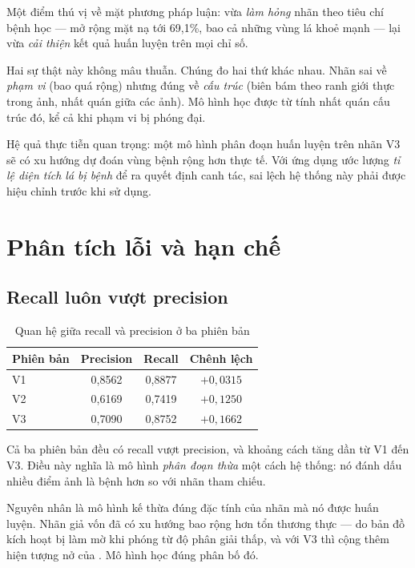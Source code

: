 Một điểm thú vị về mặt phương pháp luận: \SAM{} vừa \emph{làm hỏng} nhãn theo tiêu
chí bệnh học --- mở rộng mặt nạ tới 69,1\%, bao cả những vùng lá khoẻ mạnh ---
lại vừa \emph{cải thiện} kết quả huấn luyện trên mọi chỉ số.

Hai sự thật này không mâu thuẫn. Chúng đo hai thứ khác nhau. Nhãn \SAM{} sai về
\emph{phạm vi} (bao quá rộng) nhưng đúng về \emph{cấu trúc} (biên bám theo ranh
giới thực trong ảnh, nhất quán giữa các ảnh). Mô hình học được từ tính nhất quán
cấu trúc đó, kể cả khi phạm vi bị phóng đại.

Hệ quả thực tiễn quan trọng: một mô hình phân đoạn huấn luyện trên nhãn V3 sẽ có
xu hướng dự đoán vùng bệnh rộng hơn thực tế. Với ứng dụng ước lượng \emph{tỉ lệ
diện tích lá bị bệnh} để ra quyết định canh tác, sai lệch hệ thống này phải được
hiệu chỉnh trước khi sử dụng.

\section{Phân tích lỗi và hạn chế}
\label{sec:phantichloi}

\subsection{Recall luôn vượt precision}

\begin{table}[H]
\centering
\caption{Quan hệ giữa recall và precision ở ba phiên bản}
\label{tab:recall_precision}
\begin{tabular}{l c c c}
\toprule
\textbf{Phiên bản} & \textbf{Precision} & \textbf{Recall} & \textbf{Chênh lệch} \\
\midrule
V1 & 0,8562 & 0,8877 & $+0{,}0315$ \\
V2 & 0,6169 & 0,7419 & $+0{,}1250$ \\
V3 & 0,7090 & 0,8752 & $+0{,}1662$ \\
\bottomrule
\end{tabular}
\end{table}

Cả ba phiên bản đều có recall vượt precision, và khoảng cách tăng dần từ V1 đến
V3. Điều này nghĩa là mô hình \emph{phân đoạn thừa} một cách hệ thống: nó đánh dấu
nhiều điểm ảnh là bệnh hơn so với nhãn tham chiếu.

Nguyên nhân là mô hình kế thừa đúng đặc tính của nhãn mà nó được huấn luyện. Nhãn
giả vốn đã có xu hướng bao rộng hơn tổn thương thực --- do bản đồ kích hoạt bị làm
mờ khi phóng từ độ phân giải thấp, và với V3 thì cộng thêm hiện tượng nở của
\SAM{}. Mô hình học đúng phân bố đó.

